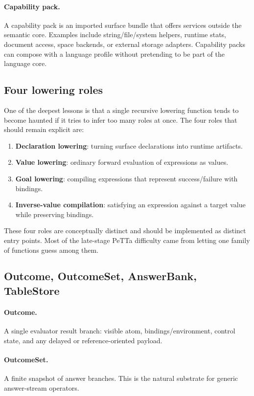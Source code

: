 \documentclass[11pt]{article}
\begin{document}
\paragraph{Capability pack.} A capability pack is an imported surface bundle that offers services outside the semantic core. Examples include string/file/system helpers, runtime stats, document access, space backends, or external storage adapters. Capability packs can compose with a language profile without pretending to be part of the language core.

\subsection{Four lowering roles}

One of the deepest lessons is that a single recursive lowering function tends to become haunted if it tries to infer too many roles at once. The four roles that should remain explicit are:
\begin{enumerate}
    \item \textbf{Declaration lowering}: turning surface declarations into runtime artifacts.
    \item \textbf{Value lowering}: ordinary forward evaluation of expressions as values.
    \item \textbf{Goal lowering}: compiling expressions that represent success/failure with bindings.
    \item \textbf{Inverse-value compilation}: satisfying an expression against a target value while preserving bindings.
\end{enumerate}

These four roles are conceptually distinct and should be implemented as distinct entry points. Most of the late-stage PeTTa difficulty came from letting one family of functions guess among them.

\subsection{Outcome, OutcomeSet, AnswerBank, TableStore}

\paragraph{Outcome.} A single evaluator result branch: visible atom, bindings/environment, control state, and any delayed or reference-oriented payload.

\paragraph{OutcomeSet.} A finite snapshot of answer branches. This is the natural substrate for generic answer-stream operators.
\end{document}
